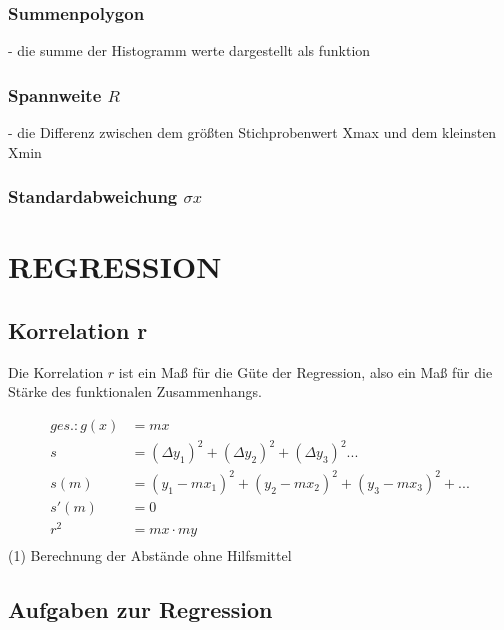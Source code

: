 \documentclass[a4paper,12pt]{article}
\begin{document}
\subsubsection{Summenpolygon}
    - die summe der Histogramm werte dargestellt als funktion

\subsubsection{Spannweite $R$}
    - die Differenz zwischen dem größten Stichprobenwert Xmax und dem kleinsten
        Xmin

\subsubsection{Standardabweichung $\sigma x$}
\pagebreak
\section{REGRESSION}
\subsection{Korrelation r}
Die Korrelation $r$ ist ein Maß für die Güte der Regression,
also ein Maß für die Stärke des funktionalen Zusammenhangs.

\begin{equation}
\begin{split}
ges.: g(x) & = mx\\
s & = (\Delta y_1)^2 + (\Delta y_2)^2 + (\Delta y_3)^2 ...\\
s(m) & = (y_1 - mx_1)^2 + (y_2 - mx_2)^2 + (y_3 - mx_3)^2 + ...\\
s'(m) & = 0\\
r^2 & = mx \cdot my\\
\end{split}
\end{equation}
(1) Berechnung der Abstände ohne Hilfsmittel
\subsection{Aufgaben zur Regression}
\end{document}
